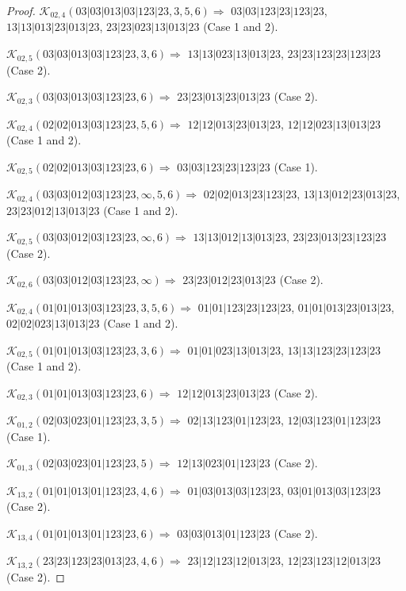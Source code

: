 \documentclass[12pt]{article}
\theoremstyle{plain}
\theoremstyle{definition}
\theoremstyle{remark}
\newcommand{\fancy}[1]{\mathcal{#1}}
\def\K{\fancy{K}}
\begin{document}
\begin{proof}
	
	\bigskip
	
	$\K_{02,4}(03|03|013|03|123|23,3, 5, 6)\Rightarrow $ $03|03|123|23|123|23$, $13|13|013|23|013|23$, $23|23|023|13|013|23$ (Case 1 and 2).
	
	$\K_{02,5}(03|03|013|03|123|23,3, 6)\Rightarrow $ $13|13|023|13|013|23$, $23|23|123|23|123|23$ (Case 2).
	
	$\K_{02,3}(03|03|013|03|123|23,6)\Rightarrow $ $23|23|013|23|013|23$ (Case 2).
	
	
	\bigskip
	
	$\K_{02,4}(02|02|013|03|123|23,5, 6)\Rightarrow $ $12|12|013|23|013|23$, $12|12|023|13|013|23$ (Case 1 and 2).
	
	$\K_{02,5}(02|02|013|03|123|23,6)\Rightarrow $ $03|03|123|23|123|23$ (Case 1).
	
	
	\bigskip
	
	$\K_{02,4}(03|03|012|03|123|23,\infty,5, 6)\Rightarrow $ $02|02|013|23|123|23$, $13|13|012|23|013|23$, $23|23|012|13|013|23$ (Case 1 and 2).
	
	$\K_{02,5}(03|03|012|03|123|23,\infty,6)\Rightarrow $ $13|13|012|13|013|23$, $23|23|013|23|123|23$ (Case 2).
	
	$\K_{02,6}(03|03|012|03|123|23,\infty)\Rightarrow $ $23|23|012|23|013|23$ (Case 2).
	
	
	\bigskip
	
	$\K_{02,4}(01|01|013|03|123|23,3, 5, 6)\Rightarrow $ $01|01|123|23|123|23$, $01|01|013|23|013|23$, $02|02|023|13|013|23$ (Case 1 and 2).
	
	$\K_{02,5}(01|01|013|03|123|23,3, 6)\Rightarrow $ $01|01|023|13|013|23$, $13|13|123|23|123|23$ (Case 1 and 2).
	
	$\K_{02,3}(01|01|013|03|123|23,6)\Rightarrow $ $12|12|013|23|013|23$ (Case 2).
	
	
	\bigskip
	
	$\K_{01,2}(02|03|023|01|123|23,3, 5)\Rightarrow $ $02|13|123|01|123|23$, $12|03|123|01|123|23$ (Case 1).
	
	$\K_{01,3}(02|03|023|01|123|23,5)\Rightarrow $ $12|13|023|01|123|23$ (Case 2).
	
	
	\bigskip
	
	$\K_{13,2}(01|01|013|01|123|23,4, 6)\Rightarrow $ $01|03|013|03|123|23$, $03|01|013|03|123|23$ (Case 2).
	
	$\K_{13,4}(01|01|013|01|123|23,6)\Rightarrow $ $03|03|013|01|123|23$ (Case 2).
	
	
	\bigskip
	
	$\K_{13,2}(23|23|123|23|013|23,4, 6)\Rightarrow $ $23|12|123|12|013|23$, $12|23|123|12|013|23$ (Case 2).
	

\end{proof}
\end{document}

